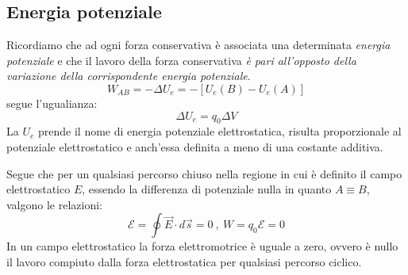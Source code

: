 \documentclass[class=book, crop=false, oneside, 12pt]{standalone}
\begin{document}
\subsection*{Energia potenziale}

Ricordiamo che ad ogni forza conservativa è associata una determinata \emph{energia potenziale} e che il lavoro della forza  conservativa \emph{è pari all'opposto della variazione della corrispondente energia potenziale}.
\begin{equation*}
    W_{AB} = - \Delta U_e = - \left[U_e (B) - U_e (A)\right]
\end{equation*}
segue l'ugualianza:
\begin{equation}
    \Delta U_e = q_0 \Delta V
\end{equation}
La \(U_e\) prende il nome di energia potenziale elettrostatica, risulta proporzionale al potenziale elettrostatico e anch'essa definita a meno di una costante additiva. 

Segue che per un qualsiasi percorso chiuso nella regione in cui è definito il campo elettrostatico \(E\), essendo la differenza di potenziale nulla in quanto \(A \equiv B\), valgono le relazioni:
\begin{equation}
    \mathcal{E} = \oint \overrightarrow{E} \cdot d \overrightarrow{s} = 0 \ , \ W = q_0 \mathcal{E} = 0
\end{equation}
In un campo elettrostatico la forza elettromotrice è uguale a zero, ovvero è nullo il lavoro compiuto dalla forza elettrostatica per qualsiasi percorso ciclico.
\end{document}
